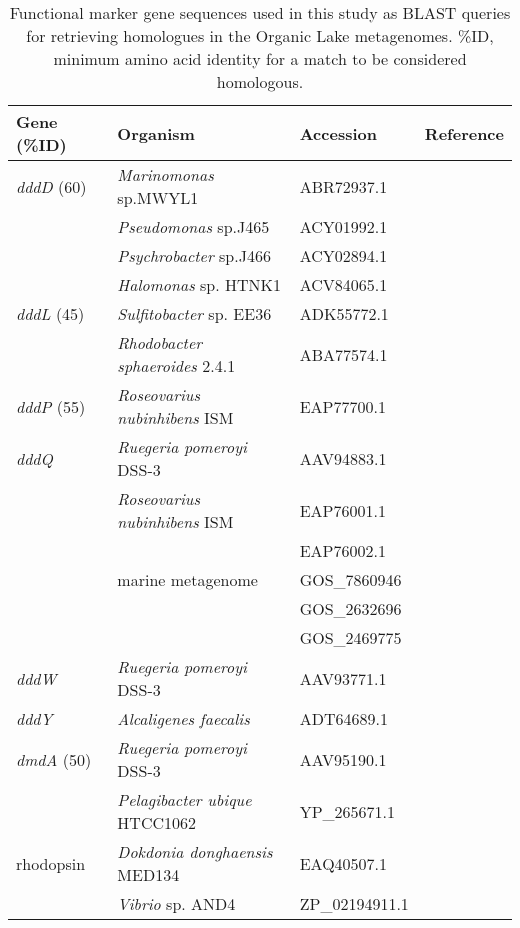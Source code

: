 \begin{table}
\footnotesize
\caption[List of query functional marker gene sequences]{Functional marker gene sequences used in this study as \ac{BLAST} queries for retrieving homologues in the Organic Lake metagenomes. \%ID, minimum amino acid identity for a match to be considered homologous.}
\label{tab:marker_genes}
\smallskip
\begin{tabularx}{\textwidth}{p{1.6cm}Xp{1.8cm}p{3.5cm}}
\toprule
\textbf{Gene (\%ID)} & \textbf{Organism} & \textbf{Accession} & \textbf{Reference} \\
\midrule
\emph{dddD} (60) & \emph{Marinomonas} sp.MWYL1 & ABR72937.1 &  \citet{Todd2007}\\
 & \emph{Pseudomonas} sp.J465 & ACY01992.1 & \citet{Curson2010}\\
 & \emph{Psychrobacter} sp.J466 & ACY02894.1 & \citet{Curson2010}\\
 & \emph{Halomonas} sp. HTNK1 & ACV84065.1 & \citet{Todd2010}\\
\emph{dddL} (45) & \emph{Sulfitobacter} sp. EE36 & ADK55772.1 & \citet{Curson2008}\\
 & \emph{Rhodobacter sphaeroides} 2.4.1 & ABA77574.1 & \citet{Curson2008}\\
\emph{dddP} (55) & \emph{Roseovarius nubinhibens} ISM & EAP77700.1 & \citet{Todd2009}\\
\emph{dddQ} & \emph{Ruegeria pomeroyi} DSS-3 & AAV94883.1 & \citet{}\\
 & \emph{Roseovarius nubinhibens} ISM & EAP76001.1 & \citet{}\\
 &  & EAP76002.1 & \citet{Todd2011}\\
 & marine metagenome & GOS\_7860946 & \citet{Todd2011}\\
 &  & GOS\_2632696 & \citet{Todd2011}\\
 &  & GOS\_2469775 & \citet{Todd2011}\\
\emph{dddW} & \emph{Ruegeria pomeroyi} DSS-3 & AAV93771.1 & \citet{Todd2012}\\
\emph{dddY} & \emph{Alcaligenes faecalis} & ADT64689.1 & \citet{Curson2011}\\
\emph{dmdA} (50) & \emph{Ruegeria pomeroyi} DSS-3 & AAV95190.1 & \citet{Howard2006}\\
 & \emph{Pelagibacter ubique} HTCC1062 & YP\_265671.1 & \citet{Howard2006}\\
rhodopsin & \emph{Dokdonia donghaensis} MED134 & EAQ40507.1 & \citet{Gomez-Consarnau2007}\\
 & \emph{Vibrio} sp. AND4 & ZP\_02194911.1 & \citet{Gomez-Consarnau2010}\\

\end{tabularx}
\end{table}
